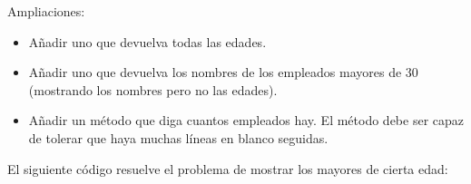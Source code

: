 \documentclass[letterpaper,10pt,spanish]{sphinxmanual}
\begin{document}
\begin{sphinxVerbatim}[commandchars=\\\{\}]
           \PYG{o}{[}\PYG{o}{]}      
                 
                 
\end{sphinxVerbatim}

Ampliaciones:
\begin{itemize}
\item {} 
Añadir uno que devuelva todas las edades.

\item {} 
Añadir uno que devuelva los nombres de los empleados mayores de 30 (mostrando los nombres pero no las edades).

\item {} 
Añadir un método que diga cuantos empleados hay. El método debe ser capaz de tolerar que haya muchas líneas en blanco seguidas.

\end{itemize}

El siguiente código resuelve el problema de mostrar los mayores de cierta edad:
\end{document}
